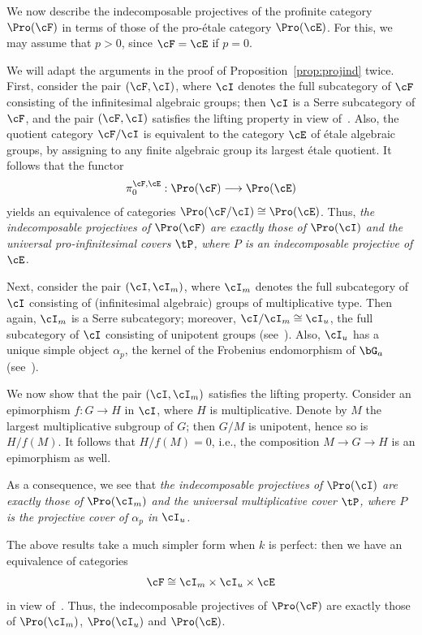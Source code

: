 \begin{rema}\label{rem:indproj}
We now describe the indecomposable projectives of the profinite category $\Pro(\cF)$ in terms of those of the pro-\'etale category $\Pro(\cE)$. For this, we may assume that $p > 0$, since $\cF = \cE$ if $p = 0$.

We will adapt the arguments in the proof of Proposition~\ref{prop:projind} twice. First, consider the pair $(\cF,\cI)$, where $\cI$ denotes the full subcategory of $\cF$ consisting of the infinitesimal algebraic groups; then $\cI$ is a Serre subcategory of $\cF$, and the pair $(\cF,\cI)$ satisfies the lifting property in view of~\cite[Lem.~2.2]{Br17a}. Also, the quotient category $\cF/\cI$ is equivalent to the category $\cE$ of \'etale algebraic groups, by assigning to any finite algebraic group its largest
\'etale quotient. It follows that the functor
\[
\pi_0^{\cF,\cE} : \Pro(\cF) \longrightarrow \Pro(\cE)
\]
yields an equivalence of categories $\Pro(\cF/\cI) \cong \Pro(\cE)$. Thus,
\emph{the indecomposable projectives of $\Pro(\cF)$ are exactly those of $\Pro(\cI)$ and the universal pro-infinitesimal covers $\tP$, where $P$ is an indecomposable projective of $\cE$.}

Next, consider the pair $(\cI,\cI_m)$, where $\cI_m$ denotes the full subcategory of $\cI$ consisting of (infinitesimal algebraic) groups of multiplicative type. Then again, $\cI_m$ is a Serre subcategory; moreover, $\cI/\cI_m \cong \cI_u$, the full subcategory of $\cI$ consisting of unipotent groups (see~\cite[IV.3.1.1]{DG}). Also, $\cI_u$ has a unique simple object $\alpha_p$, the kernel of the Frobenius endomorphism of $\bG_a$ (see~\cite[IV.2.2.5]{DG}).

We now show that the pair $(\cI,\cI_m)$ satisfies the lifting property. Consider an epimorphism $f : G \to H$ in $\cI$, where $H$ is multiplicative. Denote by $M$ the largest multiplicative subgroup of $G$; then $G/M$ is unipotent, hence so is $H/f(M)$. It follows that $H/f(M) = 0$, i.e., the composition $M \to G \to H$ is an epimorphism as well.

As a consequence, we see that
\emph{the indecomposable projectives of $\Pro(\cI)$ are exactly those of $\Pro(\cI_m)$ and the universal multiplicative cover $\tP$, where $P$ is the projective cover of $\alpha_p$ in $\cI_u$.}

The above results take a much simpler form when $k$ is perfect: then we have an equivalence of categories
\[
\cF \cong \cI_m \times \cI_u \times \cE
\]
in view of~\cite[IV.3.5.9]{DG}. Thus, the indecomposable projectives of $\Pro(\cF)$ are exactly those of $\Pro(\cI_m)$, $\Pro(\cI_u)$ and $\Pro(\cE)$.
\end{rema}


